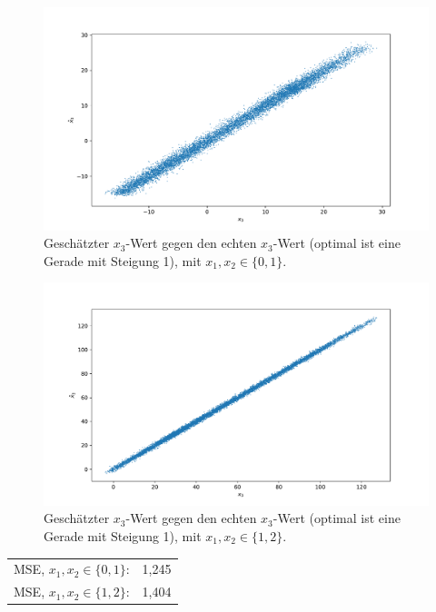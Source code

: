 \documentclass[a4paper, 11pt]{article}
\begin{document}
\begin{figure}
    \centering
    \includegraphics[width=\textwidth]{../A20/A20_x3_x3_e.pdf}
    \caption{Geschätzter $x_3$-Wert gegen den echten $x_3$-Wert (optimal ist eine Gerade mit Steigung 1), mit $x_1, x_2\in\{0, 1\}$.}
\end{figure}

\begin{figure}
    \centering
    \includegraphics[width=\textwidth]{../A20/A20_x3_x3_f.pdf}
    \caption{Geschätzter $x_3$-Wert gegen den echten $x_3$-Wert (optimal ist eine Gerade mit Steigung 1), mit $x_1, x_2\in\{1, 2\}$.}
\end{figure}

\begin{center}
    \begin{tabular}{cc}
        MSE, $x_1, x_2\in\{0, 1\}$: & 1,245 \\
        MSE, $x_1, x_2\in\{1, 2\}$: & 1,404\\
    \end{tabular}
\end{center}
\end{document}
